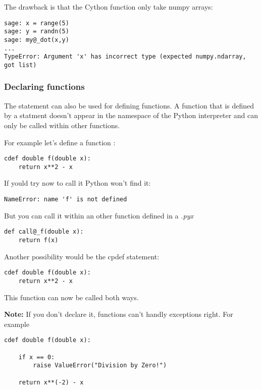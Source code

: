 \documentclass[letterpaper,10pt,english]{manual}
\begin{document}
The drawback is that the Cython function only take numpy arrays:

\begin{Verbatim}[commandchars=@\[\]]
sage: x = range(5)
sage: y = randn(5)
sage: my@_dot(x,y)
...
TypeError: Argument 'x' has incorrect type (expected numpy.ndarray, got list)
\end{Verbatim}


\subsubsection{Declaring functions}

The  statement can also be used for defining functions. A
function that is defined by a  statment doesn't appear in the
namespace of the Python interpreter and can only be called within
other functions.

For example let's define a  function
:

\begin{Verbatim}[commandchars=@\[\]]
cdef double f(double x):
    return x**2 - x
\end{Verbatim}

If yould try now to call it Python won't find it:

\begin{Verbatim}[commandchars=@\[\]]
NameError: name 'f' is not defined
\end{Verbatim}

But you can call it within an other function defined in a \emph{.pyx}

\begin{Verbatim}[commandchars=@\[\]]
def call@_f(double x):
    return f(x)
\end{Verbatim}

Another possibility would be the cpdef statement:

\begin{Verbatim}[commandchars=@\[\]]
cdef double f(double x):
    return x**2 - x
\end{Verbatim}

This function can now be called both ways.

\textbf{Note:} If you don't declare it,  functions can't handly
exceptions right. For example

\begin{Verbatim}[commandchars=@\[\]]
cdef double f(double x):

    if x == 0:
        raise ValueError("Division by Zero!")

    return x**(-2) - x
\end{Verbatim}
\end{document}
